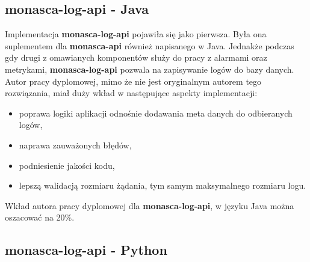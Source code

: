 \subsection{monasca-log-api - Java}
\label{chapter:application:own_work:monasca_log_api:java}
    Implementacja \textbf{monasca-log-api} pojawiła się jako pierwsza. Była ona suplementem dla \textbf{monasca-api} również 
    napisanego w Java. Jednakże podczas gdy drugi z omawianych komponentów służy do pracy z alarmami oraz metrykami, 
    \textbf{monasca-log-api} pozwala na zapisywanie logów do bazy danych. Autor pracy dyplomowej, mimo że nie jest 
    oryginalnym autorem tego rozwiązania, miał duży wkład w następujące aspekty implementacji:
    \begin{itemize}
        \item poprawa logiki aplikacji odnośnie dodawania meta danych do odbieranych logów,
        \item naprawa zauważonych błędów,
        \item podniesienie jakości kodu,
        \item lepszą walidacją rozmiaru żądania, tym samym maksymalnego rozmiaru logu.
    \end{itemize}
    
    Wkład autora pracy dyplomowej dla \textbf{monasca-log-api}, w języku Java można oszacować na 20\%.

\subsection{monasca-log-api - Python}
\label{chapter:application:own_work:monasca_log_api:python}

